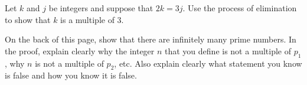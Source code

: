 \yourname


\blist{6.5in}
\item Let $k$ and $j$ be integers and suppose that $2k = 3j$.
Use the process of elimination to show that $k$ is a multiple of 3.

\item On the back of this page, show that there are infinitely many prime numbers.
In the proof, explain clearly why the integer $n$ that you define is not a multiple of $p_1$, why $n$ is not a multiple of $p_2$, etc.
Also explain clearly what statement you know is false and how you know it is false.

\elist
\vfill          %
